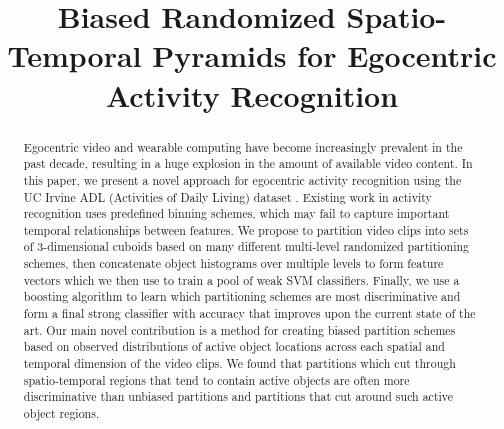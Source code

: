 \documentclass{bmvc2k}
\title{Biased Randomized Spatio-Temporal Pyramids for Egocentric Activity Recognition}
\begin{document}
\maketitle

\begin{abstract}
	Egocentric video and wearable computing have become increasingly
	prevalent in the past decade, resulting in a huge explosion in the amount
	of available video content. In this paper, we present a novel approach for
	egocentric activity recognition using the UC Irvine ADL (Activities of Daily Living)
	dataset \cite{Ramanan12}.  
  Existing work in activity recognition uses predefined binning schemes,
  which may fail to capture important temporal relationships between
  features.
  We propose to partition video clips into sets of
	3-dimensional cuboids based on many different multi-level randomized partitioning
	schemes, then concatenate object histograms
	over multiple levels to form feature vectors which we then use to train a pool
	of weak SVM classifiers. 
	Finally, we use a boosting algorithm to learn which partitioning schemes are
  most discriminative and form a
	final strong classifier with accuracy that improves upon the current state of
	the art. Our main novel contribution is a method for
	creating biased partition schemes based on observed distributions of
	active object locations across each spatial and temporal dimension of the video clips.
  We found that partitions which cut through spatio-temporal regions that
  tend to contain active objects are often more discriminative than
  unbiased partitions and 
  partitions that cut around such active object regions.
\end{abstract}

\end{document}
